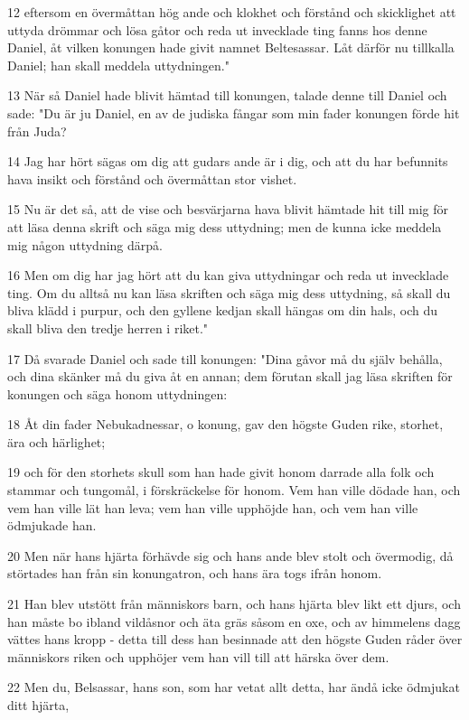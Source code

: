 \par 12 eftersom en övermåttan hög ande och klokhet och förstånd och skicklighet att uttyda drömmar och lösa gåtor och reda ut invecklade ting fanns hos denne Daniel, åt vilken konungen hade givit namnet Beltesassar. Låt därför nu tillkalla Daniel; han skall meddela uttydningen."
\par 13 När så Daniel hade blivit hämtad till konungen, talade denne till Daniel och sade: "Du är ju Daniel, en av de judiska fångar som min fader konungen förde hit från Juda?
\par 14 Jag har hört sägas om dig att gudars ande är i dig, och att du har befunnits hava insikt och förstånd och övermåttan stor vishet.
\par 15 Nu är det så, att de vise och besvärjarna hava blivit hämtade hit till mig för att läsa denna skrift och säga mig dess uttydning; men de kunna icke meddela mig någon uttydning därpå.
\par 16 Men om dig har jag hört att du kan giva uttydningar och reda ut invecklade ting. Om du alltså nu kan läsa skriften och säga mig dess uttydning, så skall du bliva klädd i purpur, och den gyllene kedjan skall hängas om din hals, och du skall bliva den tredje herren i riket."
\par 17 Då svarade Daniel och sade till konungen: "Dina gåvor må du själv behålla, och dina skänker må du giva åt en annan; dem förutan skall jag läsa skriften för konungen och säga honom uttydningen:
\par 18 Åt din fader Nebukadnessar, o konung, gav den högste Guden rike, storhet, ära och härlighet;
\par 19 och för den storhets skull som han hade givit honom darrade alla folk och stammar och tungomål, i förskräckelse för honom. Vem han ville dödade han, och vem han ville lät han leva; vem han ville upphöjde han, och vem han ville ödmjukade han.
\par 20 Men när hans hjärta förhävde sig och hans ande blev stolt och övermodig, då störtades han från sin konungatron, och hans ära togs ifrån honom.
\par 21 Han blev utstött från människors barn, och hans hjärta blev likt ett djurs, och han måste bo ibland vildåsnor och äta gräs såsom en oxe, och av himmelens dagg vättes hans kropp - detta till dess han besinnade att den högste Guden råder över människors riken och upphöjer vem han vill till att härska över dem.
\par 22 Men du, Belsassar, hans son, som har vetat allt detta, har ändå icke ödmjukat ditt hjärta,
